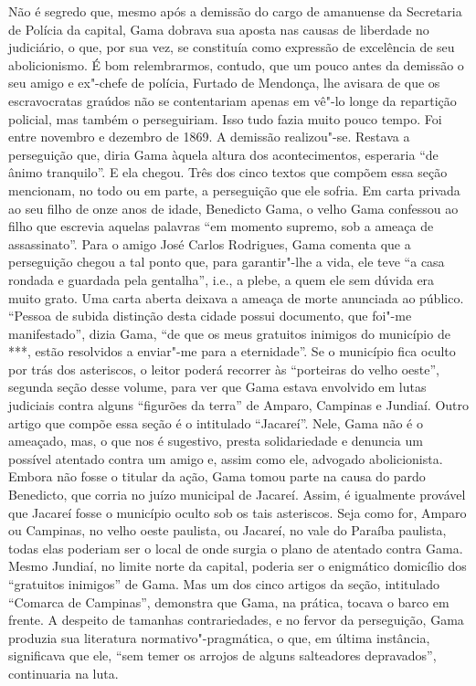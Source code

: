 {\small\noindent
Não é segredo que, mesmo após a demissão do cargo de amanuense da
Secretaria de Polícia da capital, Gama dobrava sua aposta nas causas de
liberdade no judiciário, o que, por sua vez, se constituía como
expressão de excelência de seu abolicionismo. É bom relembrarmos,
contudo, que um pouco antes da demissão o seu amigo e ex"-chefe de
polícia, Furtado de Mendonça, lhe avisara de que os escravocratas
graúdos não se contentariam apenas em vê"-lo longe da repartição
policial, mas também o perseguiriam. Isso tudo fazia muito pouco tempo.
Foi entre novembro e dezembro de 1869. A demissão realizou"-se. Restava a
perseguição que, diria Gama àquela altura dos acontecimentos, esperaria
``de ânimo tranquilo''. E ela chegou. Três dos cinco textos que compõem
essa seção mencionam, no todo ou em parte, a perseguição que ele sofria.
Em carta privada ao seu filho de onze anos de idade, Benedicto Gama, o
velho Gama confessou ao filho que escrevia aquelas palavras ``em momento
supremo, sob a ameaça de assassinato''. Para o amigo José Carlos
Rodrigues, Gama comenta que a perseguição chegou a tal ponto que, para
garantir"-lhe a vida, ele teve ``a casa rondada e guardada pela gentalha'',
i.e., a plebe, a quem ele sem dúvida era muito
grato. Uma carta aberta deixava a ameaça de morte anunciada ao
público. ``Pessoa de subida distinção desta cidade possui documento, que
foi"-me manifestado'', dizia Gama, ``de que os meus gratuitos inimigos do
município de ***, estão resolvidos a enviar"-me para a eternidade''. Se o
município fica oculto por trás dos asteriscos, o leitor poderá recorrer
às ``porteiras do velho oeste'', segunda seção desse volume, para ver que
Gama estava envolvido em lutas judiciais contra alguns ``figurões da
terra'' de Amparo, Campinas e Jundiaí. Outro artigo que compõe essa seção
é o intitulado ``Jacareí''. Nele, Gama não é o ameaçado, mas, o que nos é
sugestivo, presta solidariedade e denuncia um possível atentado contra
um amigo e, assim como ele, advogado abolicionista. Embora não fosse o
titular da ação, Gama tomou parte na causa do pardo Benedicto, que
corria no juízo municipal de Jacareí. Assim, é igualmente provável que
Jacareí fosse o município oculto sob os tais asteriscos. Seja como for,
Amparo ou Campinas, no velho oeste paulista, ou Jacareí, no vale do
Paraíba paulista, todas elas poderiam ser o local de onde surgia o plano
de atentado contra Gama. Mesmo Jundiaí, no limite norte da capital,
poderia ser o enigmático domicílio dos ``gratuitos inimigos'' de Gama.
Mas um dos cinco artigos da seção, intitulado ``Comarca de
Campinas'', demonstra que Gama, na prática, tocava o barco em frente. A
despeito de tamanhas contrariedades, e no fervor da perseguição, Gama
produzia sua literatura normativo"-pragmática, o que, em última
instância, significava que ele, ``sem temer os arrojos de alguns
salteadores depravados'', continuaria na luta. }

